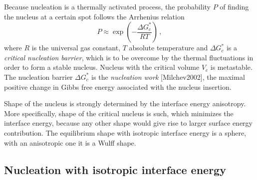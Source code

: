 Because nucleation is a thermally activated process, the probability $P$ of finding the nucleus at a certain spot follows the Arrhenius relation
\begin{equation}
    P \approx \exp\left(-\frac{\Delta G_c^*}{RT}\right) \,,
\end{equation}
where $R$ is the universal gas constant, $T$ absolute temperature and $\Delta G_c^*$ is a \textit{critical nucleation barrier}, which is to be overcome by the thermal fluctuations in order to form a stable nucleus. Nucleus with the critical volume $V_c$ is metastable. The nucleation barrier $\Delta G_c^*$ is the \textit{nucleation work} [Milchev2002], the maximal positive change in Gibbs free energy associated with the nucleus insertion.


Shape of the nucleus is strongly determined by the interface energy anisotropy. More specifically, shape of the critical nucleus is such, which minimizes the interface energy, because any other shape would give rise to larger surface energy contribution. The equilibrium shape with isotropic interface energy is a sphere, with an anisotropic one it is a Wulff shape.


    \subsection{Nucleation with isotropic interface energy}
